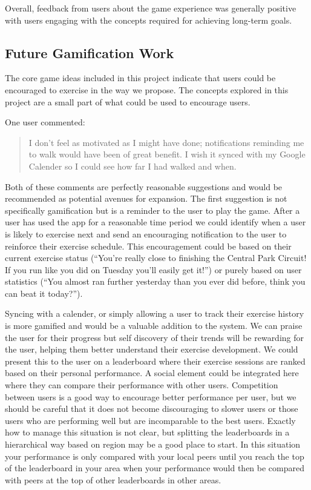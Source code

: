Overall, feedback from users about the game experience was generally
positive with users engaging with the concepts required for achieving
long-term goals. 

\subsection{Future Gamification Work}
The core game ideas included in this project indicate that users could
be encouraged to exercise in the way we propose. The concepts explored
in this project are a small part of what could be used to encourage
users. 

One user commented:
\begin{quote}
  I don't feel as motivated as I might have done; notifications
  reminding me to walk would have been of great benefit. I wish it
  synced with my Google Calender so I could see how far I had walked
  and when. 
\end{quote}
Both of these comments are perfectly reasonable suggestions and would
be recommended as potential avenues for expansion. The first
suggestion is not specifically gamification but is a reminder to the
user to play the game. After a user has used the app for a reasonable
time period we could identify when a user is likely to exercise next
and send an encouraging notification to the user to reinforce their
exercise schedule. This encouragement could be based on their current
exercise status (``You're really close to finishing the Central Park
Circuit! If you run like you did on Tuesday you'll easily get it!'')
or purely based on user statistics (``You almost ran further yesterday
than you ever did before, think you can beat it today?''). 

Syncing with a calender, or simply allowing a user to track their
exercise history is more gamified and would be a valuable addition to
the system. We can praise the user for their progress but self
discovery of their trends will be rewarding for the user, helping them
better understand their exercise development. We could present this to
the user on a leaderboard where their exercise sessions are ranked
based on their personal performance. A social element could be
integrated here where they can compare their performance with other
users. Competition between users is a good way to encourage better
performance per user, but we should be careful that it does not become
discouraging to slower users or those users who are performing well
but are incomparable to the best users. Exactly how to manage this
situation is not clear, but splitting the leaderboards in a
hierarchical way based on region may be a good place to start. In this
situation your performance is only compared with your local peers
until you reach the top of the leaderboard in your area when your
performance would then be compared with peers at the top of other
leaderboards in other areas. 

